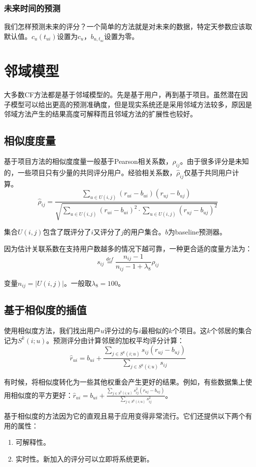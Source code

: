 \documentclass{article}
\begin{document}
 \subsubsection{未来时间的预测}
 我们怎样预测未来的评分？一个简单的方法就是对未来的数据，特定天参数应该取默认值。$c_u(t_{ui})$设置为$c_u$，$b_{u,t_{ui}}$设置为零。

 \section{邻域模型}
 大多数CF方法都是基于邻域模型的。先是基于用户，再到基于项目。虽然潜在因子模型可以给出更高的预测准确度，但是现实系统还是采用邻域方法较多，原因是邻域方法产生的结果高度可解释而且邻域方法的扩展性也较好。

 \subsection{相似度度量}
 基于项目方法的相似度度量一般基于Pearson相关系数，$\rho_{ij}$。由于很多评分是未知的，一些项目只有少量的共同评分用户。经验相关系数，$\hat{\rho}_{ij}$仅基于共同用户计算。
 $$ \hat{\rho}_{ij}=\frac{\sum_{u\in U(i,j)}(r_{ui}-b_{ui})(r_{uj}-b_{uj})}{\sqrt{\sum_{u\in U(i,j)}(r_{ui}-b_{ui})^2\cdot\sum_{u\in U(i,j)}(r_{uj}-b_{uj})^2}} $$

 集合$U(i,j)$包含了既评分了$i$又评分了$j$的用户集合。$b$为baseline预测器。

 因为估计关联系数在支持用户数越多的情况下越可靠，一种更合适的度量方法为：
 $$ s_{ij}\mathop{=}\limits^{def}\frac{n_{ij}-1}{n_{ij}-1+\lambda_8}\rho_{ij} $$

 变量$n_{ij}=|U(i,j)|$。一般取$\lambda_8=100$。

 \subsection{基于相似度的插值}
 使用相似度方法，我们找出用户$u$评分过的与$i$最相似的$k$个项目。这$k$个邻居的集合记为$S^k(i;u)$。预测评分由计算邻居的加权平均评分计算：
 $$ \hat{r}_{ui}=b_{ui}+\frac{\sum_{j\in S^k(i;u)}s_{ij}(r_{uj}-b_{uj})}{\sum_{j\in S^k(i;u)}s_{ij}} $$

 有时候，将相似度转化为一些其他权重会产生更好的结果。例如，有些数据集上使用相似度的平方更好：$\hat{r}_{ui}=b_{ui}+\frac{\sum_{j\in S^k(i;u)}s_{ij}^2(r_{uj}-b_{uj})}{\sum_{j\in S^k(i;u)}s_{ij}^2}$。

 基于相似度的方法因为它的直观且易于应用变得非常流行。它们还提供以下两个有用的属性：
 \begin{enumerate}
 \item 可解释性。
 \item 实时性。新加入的评分可以立即将系统更新。
 \end{enumerate}
\end{document}
